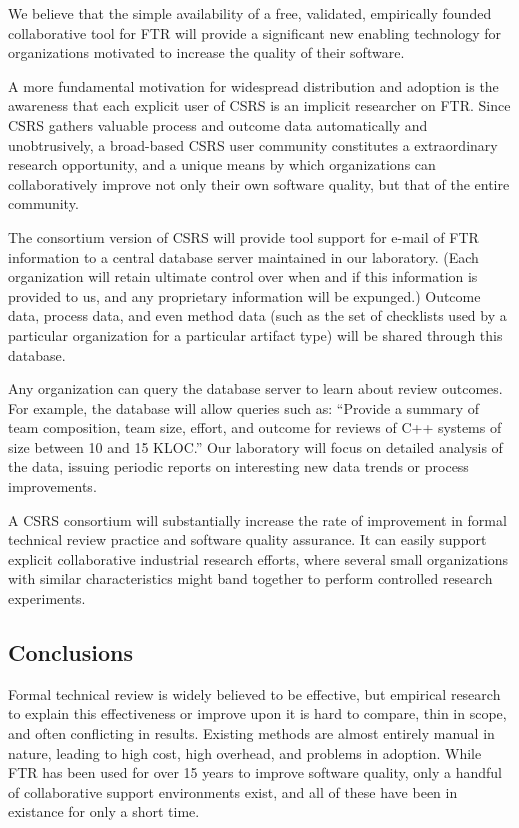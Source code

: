 We believe that the simple availability of a free, validated, empirically
founded collaborative tool for FTR will provide a significant new enabling
technology for organizations motivated to increase the quality of their
software.

A more fundamental motivation for widespread distribution and adoption is
the awareness that each explicit user of CSRS is an implicit researcher on
FTR.  Since CSRS gathers valuable process and outcome data automatically
and unobtrusively, a broad-based CSRS user community constitutes a
extraordinary research opportunity, and a unique means by which
organizations can collaboratively improve not only their own software
quality, but that of the entire community.

The consortium version of CSRS will provide tool support for e-mail of FTR
information to a central database server maintained in our laboratory.
(Each organization will retain ultimate control over when and if this
information is provided to us, and any proprietary information will be
expunged.)  Outcome data, process data, and even method data (such as the
set of checklists used by a particular organization for a particular
artifact type) will be shared through this database.

Any organization can query the database server to learn about review
outcomes.  For example, the database will allow queries such as: ``Provide
a summary of team composition, team size, effort, and outcome for reviews
of C++ systems of size between 10 and 15 KLOC.''  Our laboratory will focus
on detailed analysis of the data, issuing periodic reports on interesting
new data trends or process improvements.

A CSRS consortium will substantially increase the rate of improvement in
formal technical review practice and software quality assurance.  It can
easily support explicit collaborative industrial research efforts, where
several small organizations with similar characteristics might band
together to perform controlled research experiments.  


\subsection{Conclusions}

Formal technical review is widely believed to be effective, but empirical
research to explain this effectiveness or improve upon it is hard to
compare, thin in scope, and often conflicting in results.  Existing methods
are almost entirely manual in nature, leading to high cost, high overhead,
and problems in adoption.  While FTR has been used for over 15 years to
improve software quality, only a handful of collaborative support
environments exist, and all of these have been in existance for only a
short time.

